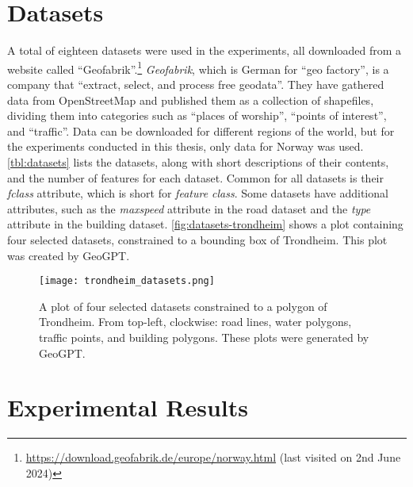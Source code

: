 \section{Datasets}
\label{sec:datasets}

A total of eighteen datasets were used in the experiments, all downloaded from a website called \enquote{Geofabrik}.\footnote{\url{https://download.geofabrik.de/europe/norway.html} (last visited on 2nd June 2024)} \textit{Geofabrik}, which is German for \enquote{geo factory}, is a company that \enquote{extract, select, and process free geodata}. They have gathered data from OpenStreetMap and published them as a collection of shapefiles, dividing them into categories such as \enquote{places of worship}, \enquote{points of interest}, and \enquote{traffic}. Data can be downloaded for different regions of the world, but for the experiments conducted in this thesis, only data for Norway was used. \autoref{tbl:datasets} lists the datasets, along with short descriptions of their contents, and the number of features for each dataset. Common for all datasets is their \emph{fclass} attribute, which is short for \emph{feature class}. Some datasets have additional attributes, such as the \emph{maxspeed} attribute in the road dataset and the \emph{type} attribute in the building dataset. \autoref{fig:datasets-trondheim} shows a plot containing four selected datasets, constrained to a bounding box of Trondheim. This plot was created by GeoGPT.



\begin{figure}
    \centering
    \texttt{[image: trondheim\_datasets.png]}
    \caption[A plot of four selected datasets constrained to a polygon of Trondheim]{A plot of four selected datasets constrained to a polygon of Trondheim. From top-left, clockwise: road lines, water polygons, traffic points, and building polygons. These plots were generated by GeoGPT.}
    \label{fig:datasets-trondheim}
\end{figure}

\FloatBarrier


\section{Experimental Results}
\label{sec:experimental-results}

